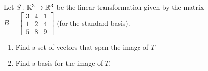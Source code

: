\begin{applicationActivities}{2}{18}
\begin{activity}{5}
Let $S: \mathbb{R}^3 \rightarrow \mathbb{R}^3$ be the linear transformation given by the matrix $B=\begin{bmatrix} 3 & 4 & 1 \\ 1 & 2 & 4 \\ 5 & 8 & 9  \end{bmatrix}$ (for the standard basis).
\begin{enumerate}[1)]
\item Find a set of vectors that span the image of $T$
\item Find a basis for the image of $T$.
\end{enumerate}
\end{activity}

\end{applicationActivities}
